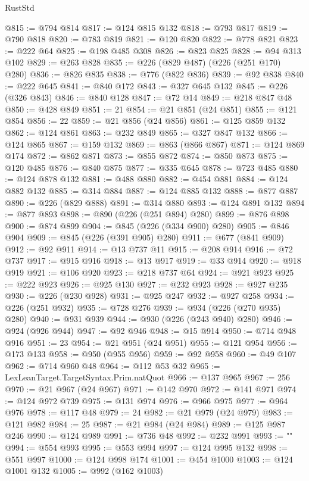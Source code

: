 \begin{lexlean}{RustStd}
\begin{coremodule}
{\begin{coremodule}
{{{{{{{{{{{{{{{{{{{{{{{{{{{{{{{{{{{{{@815 := @794 @814
@817 := @124 @815 @132
@818 := @793 @817
@819 := @790 @818
@820 := @783 @819
@821 := @120 @820
@822 := @778 @821
@823 := @222 @64
@825 := @198 @485 @308
@826 := @823 @825
@828 := @94 @313 @102
@829 := @263 @828
@835 := @226 (@829 @487) (@226 (@251 @170) @280)
@836 := @826 @835
@838 := @776 (@822 @836)
@839 := @92 @838
@840 := @222 @645
@841 := @840 @172
@843 := @327 @645 @132
@845 := @226 (@326 @843)
@846 := @840 @128
@847 := @72 @14
@849 := @218 @847 @48
@850 := @428 @849
@851 := 21
@854 := @21 @851 (@24 @851)
@855 := @121 @854
@856 := 22
@859 := @21 @856 (@24 @856)
@861 := @125 @859 @132
@862 := @124 @861
@863 := @232 @849
@865 := @327 @847 @132
@866 := @124 @865
@867 := @159 @132
@869 := @863 (@866 @867)
@871 := @124 @869 @174
@872 := @862 @871
@873 := @855 @872
@874 := @850 @873
@875 := @120 @485
@876 := @840 @875
@877 := @335 @645
@878 := @723 @485
@880 := @124 @878 @132
@881 := @488 @880
@882 := @454 @881
@884 := @124 @882 @132
@885 := @314 @884
@887 := @124 @885 @132
@888 := @877 @887
@890 := @226 (@829 @888)
@891 := @314 @880
@893 := @124 @891 @132
@894 := @877 @893
@898 := @890 (@226 (@251 @894) @280)
@899 := @876 @898
@900 := @874 @899
@904 := @845 (@226 (@334 @900) @280)
@905 := @846 @904
@909 := @845 (@226 (@391 @905) @280)
@911 := @677 (@841 @909)
@912 := @92 @911
@914 := @13 @737 @11
@915 := @208 @914
@916 := @72 @737
@917 := @915 @916
@918 := @13 @917
@919 := @33 @914
@920 := @918 @919
@921 := @106 @920
@923 := @218 @737 @64
@924 := @921 @923
@925 := @222 @923
@926 := @925 @130
@927 := @232 @923
@928 := @927 @235
@930 := @226 (@230 @928)
@931 := @925 @247
@932 := @927 @258
@934 := @226 (@251 @932)
@935 := @728 @276
@939 := @934 (@226 (@270 @935) @280)
@940 := @931 @939
@944 := @930 (@226 (@243 @940) @280)
@946 := @924 (@926 @944)
@947 := @92 @946
@948 := @15 @914
@950 := @714 @948 @916
@951 := 23
@954 := @21 @951 (@24 @951)
@955 := @121 @954
@956 := @173 @133
@958 := @950 (@955 @956)
@959 := @92 @958
@960 := @49 @107
@962 := @714 @960 @48
@964 := @112 @53 @32
@965 := LexLeanTarget.TargetSyntax.Prim.natQuot
@966 := @137 @965
@967 := 256
@970 := @21 @967 (@24 @967)
@971 := @142 @970
@972 := @141 @971
@974 := @124 @972 @739
@975 := @131 @974
@976 := @966 @975
@977 := @964 @976
@978 := @117 @48
@979 := 24
@982 := @21 @979 (@24 @979)
@983 := @121 @982
@984 := 25
@987 := @21 @984 (@24 @984)
@989 := @125 @987 @246
@990 := @124 @989
@991 := @736 @48
@992 := @232 @991
@993 := "\n"
@994 := @554 @993
@995 := @553 @994
@997 := @124 @995 @132
@998 := @551 @997
@1000 := @124 @998 @174
@1001 := @454 @1000
@1003 := @124 @1001 @132
@1005 := @992 (@162 @1003)
}}}}}}}}}}}}}}}}}}}}}}}}}}}}}}}}}}}}}
\end{coremodule}}
\end{coremodule}
\end{lexlean}
